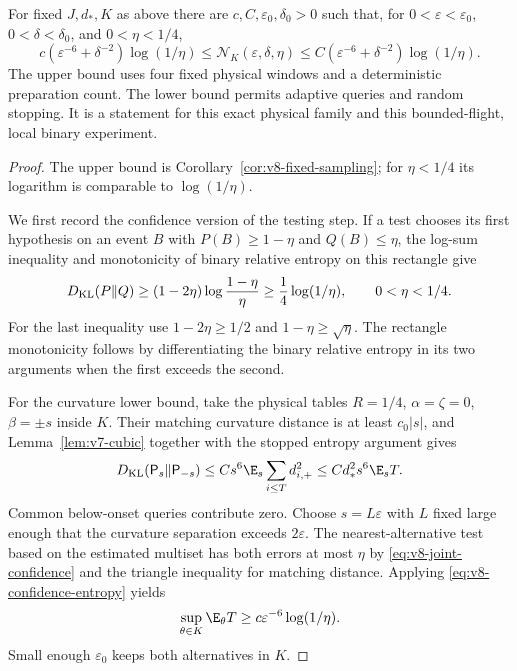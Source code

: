 \begin{theorem}
\label{thm:v8-joint-minimax}
For fixed $J,d_*,K$ as above there are $c,C,\varepsilon_0,\delta_0>0$
such that, for $0<\varepsilon<\varepsilon_0$,
$0<\delta<\delta_0$, and $0<\eta<1/4$,
\begin{equation}\label{eq:v8-joint-minimax}
 c(\varepsilon^{-6}+\delta^{-2})\log(1/\eta)
 \le\mathcal N_K(\varepsilon,\delta,\eta)
 \le C(\varepsilon^{-6}+\delta^{-2})\log(1/\eta).
\end{equation}
The upper bound uses four fixed physical windows and a deterministic
preparation count. The lower bound permits adaptive queries and random
stopping. It is a statement for this exact physical family and this
bounded-flight, local binary experiment.
\end{theorem}
\begin{proof}
The upper bound is Corollary~\ref{cor:v8-fixed-sampling}; for
$\eta<1/4$ its logarithm is comparable to $\log(1/\eta)$.

We first record the confidence version of the testing step. If a test
chooses its first hypothesis on an event $B$ with $P(B)\ge1-\eta$ and
$Q(B)\le\eta$, the log-sum inequality and monotonicity of binary
relative entropy on this rectangle give
\begin{equation}\label{eq:v8-confidence-entropy}
 D_{\rm KL}(P\Vert Q)
 \ge(1-2\eta)\log\frac{1-\eta}{\eta}
 \ge\frac14\log(1/\eta),\qquad 0<\eta<1/4.
\end{equation}
For the last inequality use $1-2\eta\ge1/2$ and
$1-\eta\ge\sqrt\eta$. The rectangle monotonicity follows by
differentiating the binary relative entropy in its two arguments when
the first exceeds the second.

For the curvature lower bound, take the physical tables
$R=1/4$, $\alpha=\zeta=0$, $\beta=\pm s$ inside $K$.
Their matching curvature distance is at least $c_0|s|$, and
Lemma~\ref{lem:v7-cubic} together with the stopped entropy argument
gives
\[
 D_{\rm KL}(\mathsf P_s\Vert\mathsf P_{-s})
       \le Cs^6\E_s\sum_{i\le T}d_{i,+}^2
       \le Cd_*^2s^6\E_s T.
\]
Common below-onset queries contribute zero. Choose
$s=L\varepsilon$ with $L$ fixed large enough that the curvature
separation exceeds $2\varepsilon$. The nearest-alternative test based
on the estimated multiset has both errors at most $\eta$ by
\eqref{eq:v8-joint-confidence} and the triangle inequality for matching
distance. Applying \eqref{eq:v8-confidence-entropy} yields
\[
                     \sup_{\theta\in K}\E_\theta T
                      \ge c\varepsilon^{-6}\log(1/\eta).
\]
Small enough $\varepsilon_0$ keeps both alternatives in $K$.


\end{proof}
